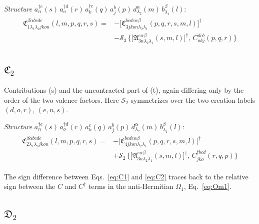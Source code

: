 \documentclass[11pt]{article}
\newcommand{\mf}{\mathfrak}
\newcommand{\dg}{\dagger}
\newcommand{\OM}{\Omega}
\newcommand{\acomm}[2]{\big\{#1,\,#2\big\}}
\begin{document}
\begin{res}
\emph{Structure} $a^{\dg e}_{n}(s)\,a^{\dg d}_{o}(r)\,a^{\dg c}_{k}(q)\,a^{b}_{j}(p)\,
d^{\alpha}_{\lambda_{2}}(m)\,b^{\beta}_{\lambda_{1}}(l)$:
\begin{align}
\boxed{
\begin{aligned}
\mf C^{\beta\alpha bcde}_{1\lambda_{1}\lambda_{2}jkon}(l,m,p,q,r,s)
=&-\Big[\mf C^{bcde\alpha\beta}_{3jkon\lambda_{2}\lambda_{1}}(p,q,r,s,m,l)\Big]^{\dg}
\\
&-\mathcal S_{3}\,\acomm{\Big[\mf A^{e\alpha\beta}_{3n\lambda_{2}\lambda_{1}}(s,m,l)\Big]^{\dg}}
{C^{dcb}_{okj}(p,q,r)}
\end{aligned}}
\label{eq:C1}
\end{align}
\end{res}

\subsection{$\mf C_{2}$}

Contributions (s) and the uncontracted part of (t), again differing only by the order of the two
valence factors. Here $\mathcal S_{2}$ symmetrizes over the two creation labels $(d,o,r)$,
$(e,n,s)$.

\begin{res}
\emph{Structure} $a^{\dg e}_{n}(s)\,a^{\dg d}_{o}(r)\,a^{c}_{k}(q)\,a^{b}_{j}(p)\,
d^{\alpha}_{\lambda_{2}}(m)\,b^{\beta}_{\lambda_{1}}(l)$:
\begin{align}
\boxed{
\begin{aligned}
\mf C^{\beta\alpha bcde}_{2\lambda_{1}\lambda_{2}jkon}(l,m,p,q,r,s)
=&-\Big[\mf C^{bcde\alpha\beta}_{4jkon\lambda_{2}\lambda_{1}}(p,q,r,s,m,l)\Big]^{\dg}
\\
&+\mathcal S_{2}\,\acomm{\Big[\mf A^{e\alpha\beta}_{3n\lambda_{2}\lambda_{1}}(s,m,l)\Big]^{\dg}}
{C^{\dg bcd}_{jko}(r,q,p)}
\end{aligned}}
\label{eq:C2}
\end{align}
\end{res}

\noindent
The sign difference between Eqs.~\eqref{eq:C1} and \eqref{eq:C2} traces back to the relative sign
between the $C$ and $C^{\dg}$ terms in the anti-Hermitian $\OM_{1}$, Eq.~\eqref{eq:Om1}.

\subsection{$\mf D_{2}$}
\end{document}
